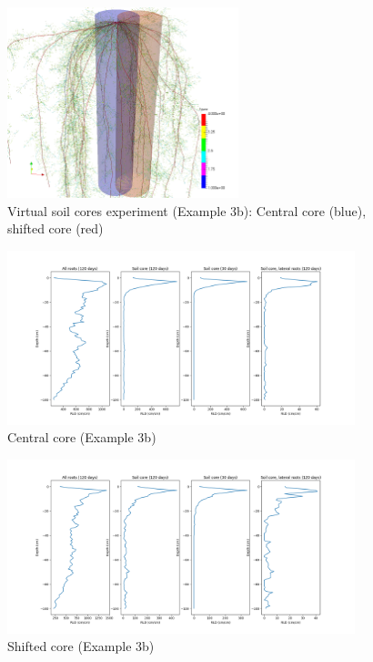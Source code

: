 \documentclass[a4paper]{article}
\begin{document}
\begin{figure}
\centering
\includegraphics[width=0.6\textwidth]{example_3b.png}
\caption{Virtual soil cores experiment (Example 3b): Central core (blue), shifted core (red)} \label{fig:soilcoreGeom}
\end{figure} 

\begin{figure}
\centering
\includegraphics[width=0.9\textwidth]{example_3b1.png} 
\caption{Central core (Example 3b)} \label{fig:central}
\end{figure}

\begin{figure}
\centering
\includegraphics[width=0.9\textwidth]{example_3b2.png} 
\caption{Shifted core (Example 3b)} \label{fig:shifted}
\end{figure}
\end{document}
